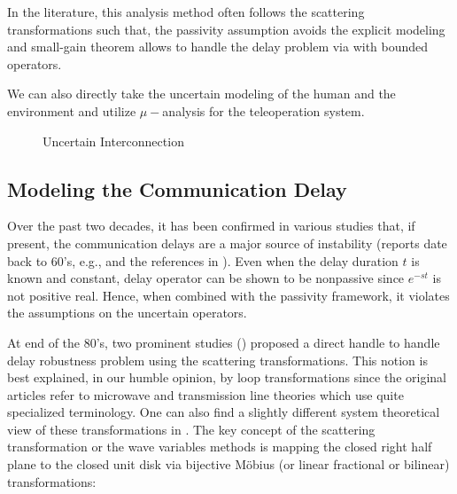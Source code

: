 In the literature, this analysis method often follows the scattering transformations such that, the passivity assumption avoids the
explicit modeling and small-gain theorem allows to handle the delay problem via with bounded operators.


We can also directly take the uncertain modeling of the human and the environment and utilize $\mu-$analysis for the teleoperation
system. 



\begin{figure}%
\centering%
\caption{Uncertain Interconnection}%
\label{fig:lit:uncincgeneral}%
\end{figure}



\subsection{Modeling the Communication Delay}

Over the past two decades, it has been confirmed in various studies that, if present, the communication delays are a major 
source of instability (reports date back to 60's, e.g., \cite{sheridanferrell} and the references in \cite{andersonspong}).
Even when the delay duration $t$ is known and constant, delay operator can be shown to be nonpassive since
$e^{-st}$ is not positive real. Hence, when combined with the passivity framework, it violates the assumptions on the uncertain
operators. 


At end of the 80's, two prominent studies (\cite{andersonspong,nieslotine}) proposed a direct handle to handle delay 
robustness problem using the scattering transformations. This notion is best explained, in our humble opinion, by loop transformations 
since the original articles refer to microwave and transmission line theories which use quite specialized terminology. One can also
find a slightly different system theoretical view of these transformations in \cite{colgate3}. The key concept of the scattering transformation
or the wave variables methods is mapping the closed right half plane to the closed unit disk via bijective M\"{o}bius (or linear 
fractional or bilinear) transformations: 
 
